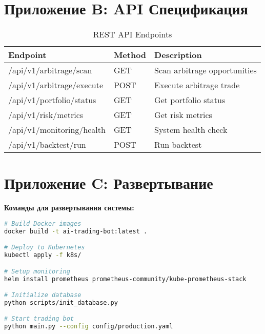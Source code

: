 \documentclass[12pt,a4paper]{article}
\begin{document}
\section{Приложение B: API Спецификация}

\begin{table}[H]
\centering
\caption{REST API Endpoints}
\begin{tabular}{@{}lll@{}}
\toprule
\textbf{Endpoint} & \textbf{Method} & \textbf{Description} \\ \midrule
/api/v1/arbitrage/scan & GET & Scan arbitrage opportunities \\
/api/v1/arbitrage/execute & POST & Execute arbitrage trade \\
/api/v1/portfolio/status & GET & Get portfolio status \\
/api/v1/risk/metrics & GET & Get risk metrics \\
/api/v1/monitoring/health & GET & System health check \\
/api/v1/backtest/run & POST & Run backtest \\
\bottomrule
\end{tabular}
\end{table}

\section{Приложение C: Развертывание}

\textbf{Команды для развертывания системы:}

\begin{lstlisting}[language=bash, caption=Deployment Commands]
# Build Docker images
docker build -t ai-trading-bot:latest .

# Deploy to Kubernetes
kubectl apply -f k8s/

# Setup monitoring
helm install prometheus prometheus-community/kube-prometheus-stack

# Initialize database
python scripts/init_database.py

# Start trading bot
python main.py --config config/production.yaml
\end{lstlisting}
\end{document}

